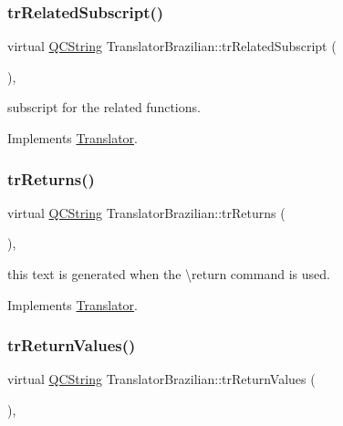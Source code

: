 \subsubsection{\texorpdfstring{trRelatedSubscript()}{trRelatedSubscript()}}
{\footnotesize\ttfamily virtual \mbox{\hyperlink{class_q_c_string}{Q\+C\+String}} Translator\+Brazilian\+::tr\+Related\+Subscript (\begin{DoxyParamCaption}{ }\end{DoxyParamCaption})\hspace{0.3cm}{\ttfamily [inline]}, {\ttfamily [virtual]}}

subscript for the related functions. 

Implements \mbox{\hyperlink{class_translator}{Translator}}.

\mbox{\label{class_translator_brazilian_a8ef0e5853d0e4554d89d14e6c591711e}} 
\subsubsection{\texorpdfstring{trReturns()}{trReturns()}}
{\footnotesize\ttfamily virtual \mbox{\hyperlink{class_q_c_string}{Q\+C\+String}} Translator\+Brazilian\+::tr\+Returns (\begin{DoxyParamCaption}{ }\end{DoxyParamCaption})\hspace{0.3cm}{\ttfamily [inline]}, {\ttfamily [virtual]}}

this text is generated when the \textbackslash{}return command is used. 

Implements \mbox{\hyperlink{class_translator}{Translator}}.

\mbox{\label{class_translator_brazilian_a1365bdabd9638389ed3d3c335cab683a}} 
\subsubsection{\texorpdfstring{trReturnValues()}{trReturnValues()}}
{\footnotesize\ttfamily virtual \mbox{\hyperlink{class_q_c_string}{Q\+C\+String}} Translator\+Brazilian\+::tr\+Return\+Values (\begin{DoxyParamCaption}{ }\end{DoxyParamCaption})\hspace{0.3cm}{\ttfamily [inline]}, {\ttfamily [virtual]}}

